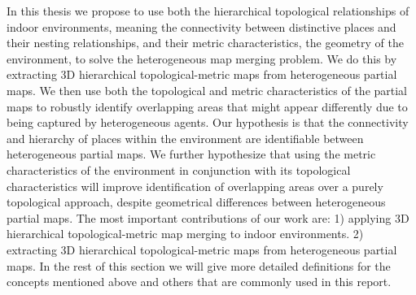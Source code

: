 In this thesis we propose to use both the hierarchical topological relationships of indoor environments, meaning the connectivity between distinctive places and their nesting relationships, and their metric characteristics, the geometry of the environment, to solve the heterogeneous map merging problem.  We do this by extracting 3D hierarchical topological-metric maps from heterogeneous partial maps. We then use both the topological and metric characteristics of the partial maps to robustly identify overlapping areas that might appear differently due to being captured by heterogeneous agents.  Our hypothesis is that the connectivity and hierarchy of places within the environment are identifiable between heterogeneous partial maps. We further hypothesize that using the metric characteristics of the environment in conjunction with its topological characteristics will improve identification of overlapping areas over a purely topological approach, despite geometrical differences between heterogeneous partial maps. The most important contributions of our work are: 1) applying 3D hierarchical topological-metric map merging to indoor environments. 2) extracting 3D hierarchical topological-metric maps from heterogeneous partial maps. In the rest of this section we will give more detailed definitions for the concepts mentioned above and others that are commonly used in this report.

